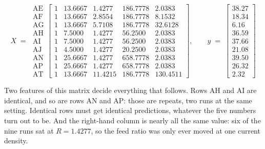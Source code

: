{\footnotesize
\setlength{\arraycolsep}{4pt}
\begin{equation}
  X \;=\;
  \begin{array}{r}
    \text{AE}\\ \text{AF}\\ \text{AG}\\ \text{AH}\\ \text{AI}\\
    \text{AJ}\\ \text{AN}\\ \text{AP}\\ \text{AT}
  \end{array}\!\!
  \begin{bmatrix}
    1 & 13.6667 & 1.4277  & 186.7778 & 2.0383   \\
    1 & 13.6667 & 2.8554  & 186.7778 & 8.1532   \\
    1 & 13.6667 & 5.7108  & 186.7778 & 32.6128  \\
    1 & 7.5000  & 1.4277  & 56.2500  & 2.0383   \\
    1 & 7.5000  & 1.4277  & 56.2500  & 2.0383   \\
    1 & 4.5000  & 1.4277  & 20.2500  & 2.0383   \\
    1 & 25.6667 & 1.4277  & 658.7778 & 2.0383   \\
    1 & 25.6667 & 1.4277  & 658.7778 & 2.0383   \\
    1 & 13.6667 & 11.4215 & 186.7778 & 130.4511
  \end{bmatrix},
  \qquad
  y \;=\;
  \begin{bmatrix}
    38.27 \\ 18.34 \\ 6.16 \\ 36.59 \\ 37.66 \\ 21.08 \\ 39.50 \\ 26.32 \\ 2.32
  \end{bmatrix}
  \label{eq:design-matrix}
\end{equation}
}

Two features of this matrix decide everything that follows. Rows AH and AI are identical, and
so are rows AN and AP: those are repeats, two runs at the same setting. Identical rows must
get identical predictions, whatever the five numbers turn out to be. And the right-hand column
is nearly all the same value: six of the nine runs sat at $R = 1.4277$, so the feed ratio was
only ever moved at one current density.

